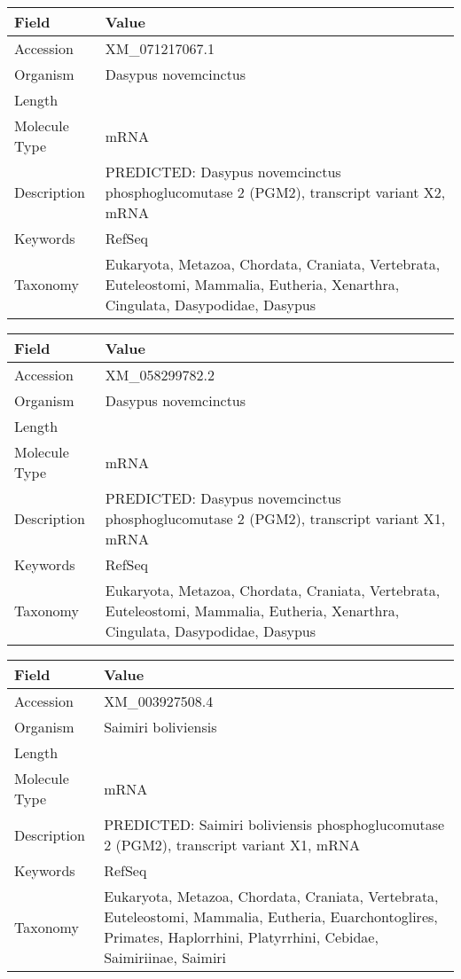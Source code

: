 \documentclass[10pt]{article}
\begin{document}
\vspace{1em}
{\footnotesize
\begin{longtable}{>{\raggedright\arraybackslash}p{4.5cm} >{\raggedright\arraybackslash}p{11.5cm}}
\textbf{Field} & \textbf{Value} \\
\hline
Accession & XM\_071217067.1 \\
Organism & Dasypus novemcinctus \\
Length & 5174 \\
Molecule Type & mRNA \\
Description & PREDICTED: Dasypus novemcinctus phosphoglucomutase 2 (PGM2), transcript variant X2, mRNA \\
Keywords & RefSeq \\
Taxonomy & Eukaryota, Metazoa, Chordata, Craniata, Vertebrata, Euteleostomi, Mammalia, Eutheria, Xenarthra, Cingulata, Dasypodidae, Dasypus \\
\end{longtable}
}

\vspace{1em}
{\footnotesize
\begin{longtable}{>{\raggedright\arraybackslash}p{4.5cm} >{\raggedright\arraybackslash}p{11.5cm}}
\textbf{Field} & \textbf{Value} \\
\hline
Accession & XM\_058299782.2 \\
Organism & Dasypus novemcinctus \\
Length & 4829 \\
Molecule Type & mRNA \\
Description & PREDICTED: Dasypus novemcinctus phosphoglucomutase 2 (PGM2), transcript variant X1, mRNA \\
Keywords & RefSeq \\
Taxonomy & Eukaryota, Metazoa, Chordata, Craniata, Vertebrata, Euteleostomi, Mammalia, Eutheria, Xenarthra, Cingulata, Dasypodidae, Dasypus \\
\end{longtable}
}

\vspace{1em}
{\footnotesize
\begin{longtable}{>{\raggedright\arraybackslash}p{4.5cm} >{\raggedright\arraybackslash}p{11.5cm}}
\textbf{Field} & \textbf{Value} \\
\hline
Accession & XM\_003927508.4 \\
Organism & Saimiri boliviensis \\
Length & 2833 \\
Molecule Type & mRNA \\
Description & PREDICTED: Saimiri boliviensis phosphoglucomutase 2 (PGM2), transcript variant X1, mRNA \\
Keywords & RefSeq \\
Taxonomy & Eukaryota, Metazoa, Chordata, Craniata, Vertebrata, Euteleostomi, Mammalia, Eutheria, Euarchontoglires, Primates, Haplorrhini, Platyrrhini, Cebidae, Saimiriinae, Saimiri \\
\end{longtable}
}
\end{document}
